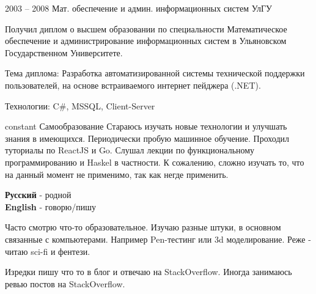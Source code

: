 \documentclass[10pt]{tpl/developercv} %
\begin{document}

\begin{entrylist}
	\entry
		{2003 -- 2008}
		{Мат. обеспечение и админ. информационных систем}
		{УлГУ}
		{Получил диплом о высшем образовании по специальности Математическое обеспечение и администрирование информационных систем в Ульяновском Государственном Университете.

		Тема диплома: Разработка автоматизированной системы технической поддержки пользователей, на основе встраиваемого интернет пейджера (.NET).

		Технологии: C\#, MSSQL, Client-Server
		}
	\entry
		{constant}
		{Самообразование}
		{}
		{Стараюсь изучать новые технологии и улучшать знания в имеющихся. Периодически пробую машинное обучение. Проходил туториалы по ReactJS и Go. Слушал лекции по функциональному программированию и Haskel в частности. К сожалению, сложно изучать то, что на данный момент не применимо, так как негде применить. }
\end{entrylist}


\begin{minipage}[t]{0.3\textwidth}
	\vspace{-\baselineskip} %


	\textbf{Русский} - родной\\
	\textbf{English} - говорю/пишу\\
\end{minipage}
\hfill
\begin{minipage}[t]{0.3\textwidth}
	\vspace{-\baselineskip} %


	Часто смотрю что-то образовательное. Изучаю разные штуки, в основном связанные с компьютерами. Например Pen-тестинг или 3d моделирование.
	Реже - читаю sci-fi и фентези.
\end{minipage}
\hfill
\begin{minipage}[t]{0.3\textwidth}
	\vspace{-\baselineskip} %


	Изредки пишу что то в блог и отвечаю на StackOverflow. Иногда занимаюсь ревью постов на StackOverflow.
\end{minipage}
\end{document}
